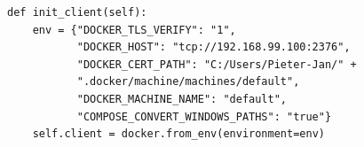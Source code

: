 \begin{minipage}{\linewidth}
\begin{center}
\begin{lstlisting}[captionpos=b,caption={Parameters voor de Docker client},label={list:dockerClient}]
def init_client(self):
    env = {"DOCKER_TLS_VERIFY": "1",
           "DOCKER_HOST": "tcp://192.168.99.100:2376",
           "DOCKER_CERT_PATH": "C:/Users/Pieter-Jan/" +
           ".docker/machine/machines/default",
           "DOCKER_MACHINE_NAME": "default",
           "COMPOSE_CONVERT_WINDOWS_PATHS": "true"}
    self.client = docker.from_env(environment=env)
\end{lstlisting}
\end{center}
\end{minipage}


